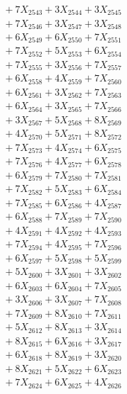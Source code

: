 \documentclass[a4paper,10pt]{article}
\begin{document}
{\begin{align}
&\;  + 7 X_{2543} + 3 X_{2544} + 3 X_{2545} \\[0.3ex]
&\;  + 7 X_{2546} + 3 X_{2547} + 3 X_{2548} \\[0.3ex]
&\;  + 6 X_{2549} + 6 X_{2550} + 7 X_{2551} \\[0.3ex]
&\;  + 7 X_{2552} + 5 X_{2553} + 6 X_{2554} \\[0.3ex]
&\;  + 7 X_{2555} + 3 X_{2556} + 7 X_{2557} \\[0.3ex]
&\;  + 6 X_{2558} + 4 X_{2559} + 7 X_{2560} \\[0.5ex]\allowbreak
&\;  + 6 X_{2561} + 3 X_{2562} + 7 X_{2563} \\[0.3ex]
&\;  + 6 X_{2564} + 3 X_{2565} + 7 X_{2566} \\[0.3ex]
&\;  + 3 X_{2567} + 5 X_{2568} + 8 X_{2569} \\[0.3ex]
&\;  + 4 X_{2570} + 5 X_{2571} + 8 X_{2572} \\[0.3ex]
&\;  + 7 X_{2573} + 4 X_{2574} + 6 X_{2575} \\[0.3ex]
&\;  + 7 X_{2576} + 4 X_{2577} + 6 X_{2578} \\[0.3ex]
&\;  + 6 X_{2579} + 7 X_{2580} + 7 X_{2581} \\[0.3ex]
&\;  + 7 X_{2582} + 5 X_{2583} + 6 X_{2584} \\[0.3ex]
&\;  + 7 X_{2585} + 6 X_{2586} + 4 X_{2587} \\[0.3ex]
&\;  + 6 X_{2588} + 7 X_{2589} + 7 X_{2590} \\[0.5ex]\allowbreak
&\;  + 4 X_{2591} + 4 X_{2592} + 4 X_{2593} \\[0.3ex]
&\;  + 7 X_{2594} + 4 X_{2595} + 7 X_{2596} \\[0.3ex]
&\;  + 6 X_{2597} + 5 X_{2598} + 5 X_{2599} \\[0.3ex]
&\;  + 5 X_{2600} + 3 X_{2601} + 3 X_{2602} \\[0.3ex]
&\;  + 6 X_{2603} + 6 X_{2604} + 7 X_{2605} \\[0.3ex]
&\;  + 3 X_{2606} + 3 X_{2607} + 7 X_{2608} \\[0.3ex]
&\;  + 7 X_{2609} + 8 X_{2610} + 7 X_{2611} \\[0.3ex]
&\;  + 5 X_{2612} + 8 X_{2613} + 3 X_{2614} \\[0.3ex]
&\;  + 8 X_{2615} + 6 X_{2616} + 3 X_{2617} \\[0.3ex]
&\;  + 6 X_{2618} + 8 X_{2619} + 3 X_{2620} \\[0.5ex]\allowbreak
&\;  + 8 X_{2621} + 5 X_{2622} + 6 X_{2623} \\[0.3ex]
&\;  + 7 X_{2624} + 6 X_{2625} + 4 X_{2626} \\[0.3ex]

\end{align}}
\end{document}
